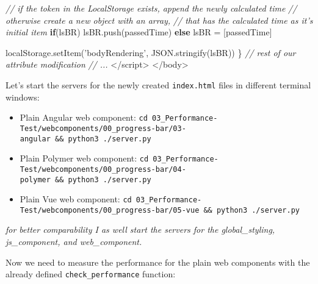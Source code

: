 \documentclass[11pt]{article}
\providecommand{\tightlist}{%
      \setlength{\itemsep}{0pt}\setlength{\parskip}{0pt}}
\newenvironment{Shaded}{}{}
\newcommand{\StringTok}[1]{\textcolor[rgb]{0.25,0.44,0.63}{{#1}}}
\newcommand{\CommentTok}[1]{\textcolor[rgb]{0.38,0.63,0.69}{\textit{{#1}}}}
\newcommand{\NormalTok}[1]{{#1}}
\newcommand{\VariableTok}[1]{\textcolor[rgb]{0.10,0.09,0.49}{{#1}}}
\newcommand{\ControlFlowTok}[1]{\textcolor[rgb]{0.00,0.44,0.13}{\textbf{{#1}}}}
\newcommand{\OperatorTok}[1]{\textcolor[rgb]{0.40,0.40,0.40}{{#1}}}
\newcommand{\AttributeTok}[1]{\textcolor[rgb]{0.49,0.56,0.16}{{#1}}}
\begin{document}
\begin{Shaded}
\begin{Highlighting}[]
                \CommentTok{// if the token in the LocalStorage exists, append the newly calculated time}
                \CommentTok{// otherwise create a new object with an array, }
                \CommentTok{// that has the calculated time as it's initial item}
                \ControlFlowTok{if}\NormalTok{(lsBR)}
                    \VariableTok{lsBR}\NormalTok{.}\AttributeTok{push}\NormalTok{(passedTime)}
                \ControlFlowTok{else}
\NormalTok{                    lsBR }\OperatorTok{=}\NormalTok{ [passedTime]}

                \VariableTok{localStorage}\NormalTok{.}\AttributeTok{setItem}\NormalTok{(}\StringTok{'bodyRendering'}\OperatorTok{,} \VariableTok{JSON}\NormalTok{.}\AttributeTok{stringify}\NormalTok{(lsBR))}
            \OperatorTok{\}}
    \CommentTok{// rest of our attribute modification}
    \CommentTok{// ...}
\NormalTok{    </script}\OperatorTok{>}
\NormalTok{</body}\OperatorTok{>}
\end{Highlighting}
\end{Shaded}

    Let's start the servers for the newly created \texttt{index.html} files
in different terminal windows:

\begin{itemize}
\tightlist
\item
  Plain Angular web component:
  \texttt{cd\ 03\_Performance-Test/webcomponents/00\_progress-bar/03-angular\ \&\&\ python3\ ./server.py}
\item
  Plain Polymer web component:
  \texttt{cd\ 03\_Performance-Test/webcomponents/00\_progress-bar/04-polymer\ \&\&\ python3\ ./server.py}
\item
  Plain Vue web component:
  \texttt{cd\ 03\_Performance-Test/webcomponents/00\_progress-bar/05-vue\ \&\&\ python3\ ./server.py}
\end{itemize}

\emph{for better comparability I as well start the servers for the
global\_styling, js\_component, and web\_component.}

    Now we need to measure the performance for the plain web components with
the already defined \texttt{check\_performance} function:
\end{document}
